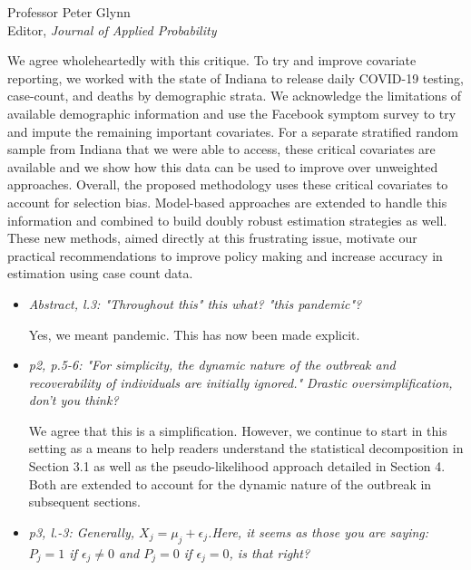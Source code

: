 \documentclass[11pt]{letter} %
\begin{document}
\begin{letter}{Professor
	Peter Glynn\\
	Editor, {\em Journal of Applied Probability}}
\begin{enumerate}
\vspace{5mm}
We agree wholeheartedly with this critique.  To try and improve covariate reporting, we worked with the state of Indiana to release daily COVID-19 testing, case-count, and deaths by demographic strata. We acknowledge the limitations of available demographic information and use the Facebook symptom survey to try and impute the remaining important covariates.  For a separate stratified random sample from Indiana that we were able to access, these critical covariates are available and we show how this data can be used to improve over unweighted approaches.  Overall, the proposed methodology uses these critical covariates to account for selection bias.  Model-based approaches are extended to handle this information and combined to build doubly robust estimation strategies as well.  These new methods, aimed directly at this frustrating issue, motivate our practical recommendations to improve policy making and increase accuracy in estimation using case count data.
\vspace{5mm}

\end{enumerate}



\begin{itemize}
\item {\it Abstract, l.3: "Throughout this" this what? "this pandemic"?}

\vspace{5mm}
Yes, we meant pandemic.  This has now been made explicit.
\vspace{5mm}

\item {\it p2, p.5-6: "For simplicity, the dynamic nature of the outbreak and recoverability of individuals are initially ignored." Drastic oversimplification, don't you think?}

\vspace{5mm}
We agree that this is a simplification.  However, we continue to start in this setting as a means to help readers understand the statistical decomposition in Section 3.1 as well as the pseudo-likelihood approach detailed in Section 4.  Both are extended to account for the dynamic nature of the outbreak in subsequent sections.
\vspace{5mm}

\item {\it p3, l.-3: Generally, $X_j = \mu_j + \epsilon_j$.Here, it seems as those you are saying: $P_j = 1$ if $\epsilon_j \neq 0$ and $P_j = 0$ if $\epsilon_j = 0$, is that right?}


\end{itemize}
\end{letter}
\end{document}
